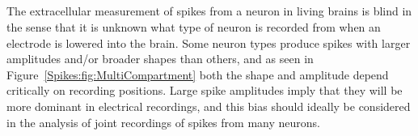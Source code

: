 \subsection{}
\label{Spikes:sec:spike-widths-amplitudes}
The extracellular measurement of spikes from a neuron in living brains is blind in the sense that it is
unknown what type of neuron is recorded from when an electrode is lowered into the brain.
Some neuron types produce spikes with larger amplitudes and/or broader shapes than
others, and as seen in Figure~\ref{Spikes:fig:MultiCompartment} both the shape and amplitude 
depend critically on recording positions. Large spike amplitudes imply that they will be more dominant in electrical recordings,
and this bias should ideally be considered in the analysis of joint recordings 
of spikes from many neurons.


